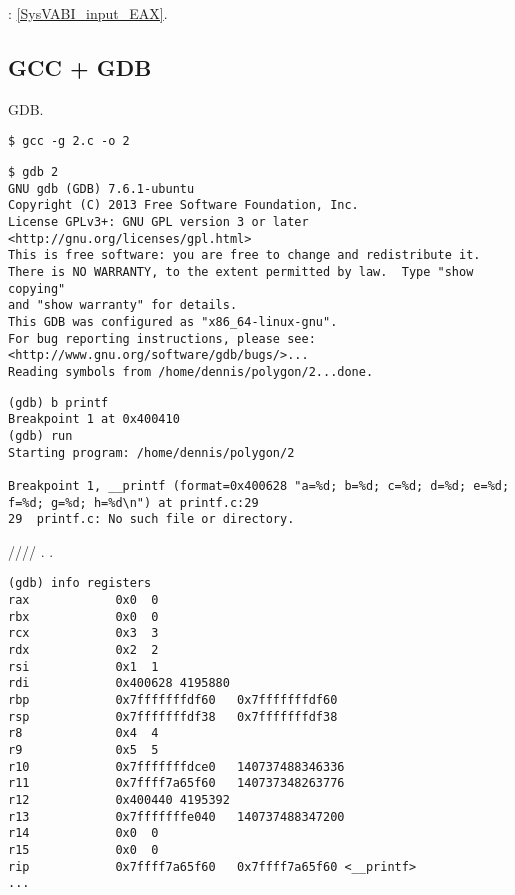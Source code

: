 : \ref{SysVABI_input_EAX}.



\subsection{GCC + GDB}

 \ac{GDB}.

\begin{lstlisting}
$ gcc -g 2.c -o 2
\end{lstlisting}

\begin{lstlisting}
$ gdb 2
GNU gdb (GDB) 7.6.1-ubuntu
Copyright (C) 2013 Free Software Foundation, Inc.
License GPLv3+: GNU GPL version 3 or later <http://gnu.org/licenses/gpl.html>
This is free software: you are free to change and redistribute it.
There is NO WARRANTY, to the extent permitted by law.  Type "show copying"
and "show warranty" for details.
This GDB was configured as "x86_64-linux-gnu".
For bug reporting instructions, please see:
<http://www.gnu.org/software/gdb/bugs/>...
Reading symbols from /home/dennis/polygon/2...done.
\end{lstlisting}

\begin{lstlisting}[caption=\RU{ставим брякпойнт на \printf, запускаем}\EN{let's set breakpoint to \printf, and run}]
(gdb) b printf
Breakpoint 1 at 0x400410
(gdb) run
Starting program: /home/dennis/polygon/2 

Breakpoint 1, __printf (format=0x400628 "a=%d; b=%d; c=%d; d=%d; e=%d; f=%d; g=%d; h=%d\n") at printf.c:29
29	printf.c: No such file or directory.
\end{lstlisting}

 \RSI/\RDX/\RCX// 
.
\RIP {} \printf{}.

\begin{lstlisting}
(gdb) info registers
rax            0x0	0
rbx            0x0	0
rcx            0x3	3
rdx            0x2	2
rsi            0x1	1
rdi            0x400628	4195880
rbp            0x7fffffffdf60	0x7fffffffdf60
rsp            0x7fffffffdf38	0x7fffffffdf38
r8             0x4	4
r9             0x5	5
r10            0x7fffffffdce0	140737488346336
r11            0x7ffff7a65f60	140737348263776
r12            0x400440	4195392
r13            0x7fffffffe040	140737488347200
r14            0x0	0
r15            0x0	0
rip            0x7ffff7a65f60	0x7ffff7a65f60 <__printf>
...
\end{lstlisting}

